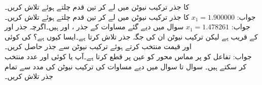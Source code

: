 \quad
{} کا جذر ترکیب نیوٹن میں  لے کر تین قدم چلتے ہوئے  تلاش کریں۔\\
جواب:\quad 
$x_1=\num{1.900000}$
\quad
{} کا جذر ترکیب نیوٹن میں  لے کر تین قدم چلتے ہوئے تلاش کریں۔\\
جواب:\quad
$x_1=\num{1.478261}$
\quad
سوال  میں دیے گئے مساوات کے جذر ،  اور  ہیں۔اگرچہ  جذر  اور  کے قریب ہے لیکن ترکیب نیوٹن ان کی جگہ جذر  تلاش کرتا ہے۔ایسا کیوں ہے؟  کی کوئی اور قیمت منتخب کرتے ہوئے ترکیب نیوٹن سے جذر  حاصل کریں۔\\
جواب:\quad
تفاعل  کو  پر مماس  محور کو عین  پر قطع کرتا ہے۔آپ  یا کوئی اور عدد منتخب کر سکتے ہیں۔
سوال  تا سوال  میں  دیے مساوات کی ترکیب نیوٹن کی مدد سے تمام جذر تلاش کریں۔

